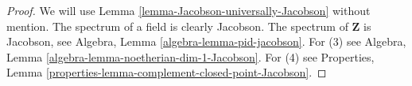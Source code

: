 \begin{proof}
We will use Lemma \ref{lemma-Jacobson-universally-Jacobson} without mention.
The spectrum of a field is clearly Jacobson.
The spectrum of $\mathbf{Z}$ is Jacobson, see
Algebra, Lemma \ref{algebra-lemma-pid-jacobson}.
For (3) see
Algebra, Lemma \ref{algebra-lemma-noetherian-dim-1-Jacobson}.
For (4) see
Properties, Lemma \ref{properties-lemma-complement-closed-point-Jacobson}.
\end{proof}







